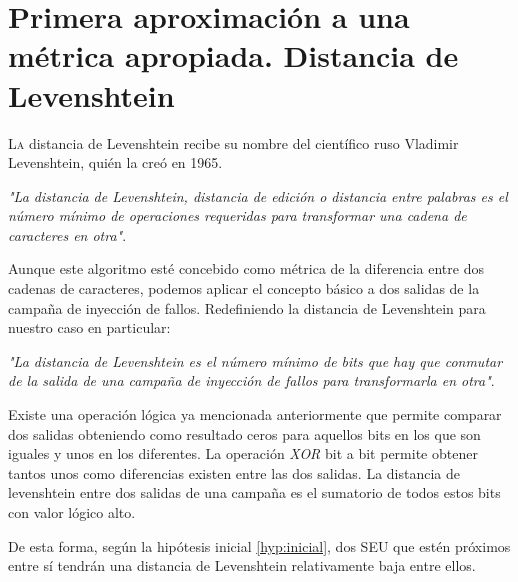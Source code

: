 \chapter{Primera aproximación a una métrica apropiada. Distancia de Levenshtein}
\label{ch:Levenshtein}

\lettrine[lraise=-0.1, lines=2, loversize=0.2]{L}{a} distancia de Levenshtein
recibe su nombre del científico ruso Vladimir Levenshtein, quién la creó en 1965.

\vspace{0.3cm}
\textit{"La distancia de Levenshtein, distancia de edición o distancia entre
palabras es el número mínimo de operaciones requeridas para transformar una cadena
de caracteres en otra"}.
\vspace{-0.2cm}
{}
\vspace{0.3cm}

Aunque este algoritmo esté concebido como métrica de la diferencia entre dos
cadenas de caracteres, podemos aplicar el concepto básico a dos salidas de la
campaña de inyección de fallos. Redefiniendo la distancia de Levenshtein para
nuestro caso en particular:

\vspace{0.3cm}
\textit{"La distancia de Levenshtein es el número mínimo de bits que hay que
conmutar de la salida de una campaña de inyección de fallos para transformarla 
en otra"}.
\vspace{0.3cm}

Existe una operación lógica ya mencionada anteriormente que permite comparar dos
salidas obteniendo como resultado ceros para aquellos bits en los que son iguales
y unos en los diferentes. La operación \textit{XOR} bit a bit permite obtener
tantos unos como diferencias existen entre las dos salidas. La distancia de
levenshtein entre dos salidas de una campaña es el sumatorio de todos estos bits 
con valor lógico alto.

De esta forma, según la hipótesis inicial \ref{hyp:inicial}, dos \gls{SEU}
que estén próximos entre sí tendrán una distancia de Levenshtein relativamente
baja entre ellos.


